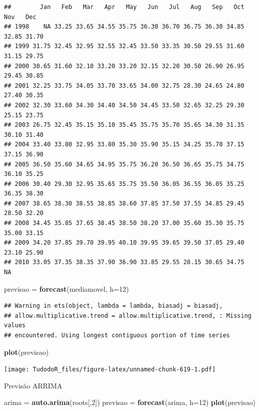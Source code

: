 \documentclass[
]{book}
\newenvironment{Shaded}{\begin{snugshade}}{\end{snugshade}}
\newcommand{\DataTypeTok}[1]{\textcolor[rgb]{0.13,0.29,0.53}{#1}}
\newcommand{\DecValTok}[1]{\textcolor[rgb]{0.00,0.00,0.81}{#1}}
\newcommand{\KeywordTok}[1]{\textcolor[rgb]{0.13,0.29,0.53}{\textbf{#1}}}
\newcommand{\NormalTok}[1]{#1}
\newcommand{\StringTok}[1]{\textcolor[rgb]{0.31,0.60,0.02}{#1}}
\begin{document}
\begin{verbatim}
##        Jan   Feb   Mar   Apr   May   Jun   Jul   Aug   Sep   Oct   Nov   Dec
## 1998    NA 33.25 33.65 34.55 35.75 36.30 36.70 36.75 36.30 34.85 32.85 31.70
## 1999 31.75 32.45 32.95 32.55 32.45 33.50 33.35 30.50 29.55 31.60 31.15 29.75
## 2000 30.65 31.60 32.10 33.20 33.20 32.15 32.20 30.50 26.90 26.95 29.45 30.85
## 2001 32.25 33.75 34.05 33.70 33.65 34.00 32.75 28.30 24.65 24.80 27.40 30.35
## 2002 32.30 33.60 34.30 34.40 34.50 34.45 33.50 32.65 32.25 29.30 25.15 23.75
## 2003 26.75 32.45 35.15 35.10 35.45 35.75 35.70 35.65 34.30 31.35 30.10 31.40
## 2004 33.40 33.80 32.95 33.80 35.30 35.90 35.15 34.25 35.70 37.15 37.15 36.90
## 2005 36.50 35.60 34.65 34.95 35.75 36.20 36.50 36.65 35.75 34.75 36.10 35.25
## 2006 30.40 29.30 32.95 35.65 35.75 35.50 36.05 36.55 36.05 35.25 36.35 38.30
## 2007 38.65 38.30 38.55 38.85 38.60 37.85 37.50 37.55 34.85 29.45 28.50 32.20
## 2008 34.45 35.85 37.65 38.45 38.50 38.20 37.00 35.60 35.30 35.75 35.00 33.15
## 2009 34.20 37.85 39.70 39.95 40.10 39.95 39.65 39.50 37.05 29.40 23.10 25.90
## 2010 33.05 37.35 38.35 37.90 36.90 33.85 29.55 28.15 30.65 34.75    NA
\end{verbatim}

\begin{Shaded}
\begin{Highlighting}[]
\NormalTok{previsao =}\StringTok{ }\KeywordTok{forecast}\NormalTok{(mediamovel, }\DataTypeTok{h=}\DecValTok{12}\NormalTok{)}
\end{Highlighting}
\end{Shaded}

\begin{verbatim}
## Warning in ets(object, lambda = lambda, biasadj = biasadj,
## allow.multiplicative.trend = allow.multiplicative.trend, : Missing values
## encountered. Using longest contiguous portion of time series
\end{verbatim}

\begin{Shaded}
\begin{Highlighting}[]
\KeywordTok{plot}\NormalTok{(previsao)}
\end{Highlighting}
\end{Shaded}

\texttt{[image: TudodoR\_files/figure-latex/unnamed-chunk-619-1.pdf]}

Previsão ARRIMA

\begin{Shaded}
\begin{Highlighting}[]
\NormalTok{arima =}\StringTok{ }\KeywordTok{auto.arima}\NormalTok{(roots[,}\DecValTok{2}\NormalTok{])}
\NormalTok{previsao =}\StringTok{ }\KeywordTok{forecast}\NormalTok{(arima, }\DataTypeTok{h=}\DecValTok{12}\NormalTok{)}
\KeywordTok{plot}\NormalTok{(previsao)}
\end{Highlighting}
\end{Shaded}
\end{document}
